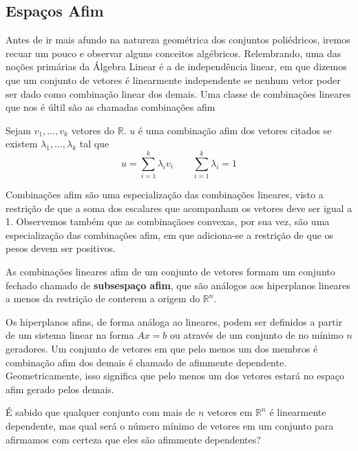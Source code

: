 \subsection{Espaços Afim}

Antes de ir mais afundo na natureza geométrica dos conjuntos
poliédricos, iremos recuar um pouco e observar alguns conceitos
algébricos. Relembrando, uma das noções primárias da Álgebra Linear é a de
independência linear, em que dizemos que um conjunto de vetores
é linearmente independente se nenhum vetor poder ser dado
como combinação linear dos demais. Uma classe de combinações
lineares que nos é últil são as chamadas combinações afim

\begin{def:combinação afim}
Sejam $v_1, \ldots, v_k$ vetores do $\mathbb{R}$. $u$ é uma
combinação afim dos vetores citados  se existem $\lambda_1, \ldots,
\lambda_k$ tal que
\begin{equation*}
	u = \sum_{i =1}^{k}\lambda_i v_i \quad \quad \sum_{i=1}^{k} \lambda_i = 1
\end{equation*}
\end{def:combinação afim}
Combinações afim são uma especialização das combinações
lineares, visto a restrição de que a soma dos escalares
que acompanham os vetores deve ser igual a 1. Observemos
também que as combinaçãoes convexas, por sua vez, são uma
especialização das combinações afim, em que adiciona-se a
restrição de que os pesos devem ser positivos.

As combinações lineares afim de um conjunto de vetores
formam um conjunto fechado chamado de \textbf{subsespaço afim},
que são análogos aos hiperplanos lineares a menos
da restrição de conterem a
origem do $\mathbb{R}^n$.


Os hiperplanos  afins, de forma análoga ao lineares, podem ser
definidos a partir de um sistema linear na forma $Ax = b$
ou através de um conjunto de no mínimo $n$ geradores.
Um conjunto de vetores em que pelo menos um dos membros
é combinação afim dos demais é chamado de afimmente dependente.
Geometricamente, isso significa que pelo menos um dos vetores estará
no espaço afim gerado pelos demais.

É sabido que qualquer conjunto com mais de $n$ vetores em
$\mathbb{R}^n$ é linearmente dependente, mas qual será o número mínimo
de vetores em um conjunto para afirmamos com certeza que eles são
afimmente dependentes?

